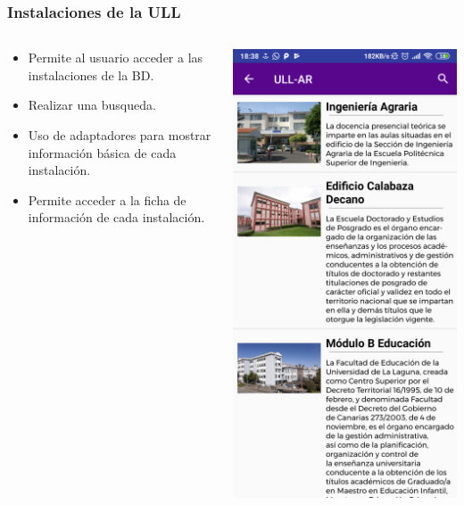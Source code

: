 \begin{frame}
	\frametitle{Instalaciones de la ULL}
	\begin{columns}
		\begin{column}{0.6\textwidth}
			\begin{itemize}
				\item Permite al usuario acceder a las instalaciones de la BD.
				\item Realizar una busqueda.
				\item Uso de adaptadores para mostrar información básica de cada instalación.
				\item Permite acceder a la ficha de información de cada instalación.
			\end{itemize}
			\endblock{}
		\end{column}
		\begin{column}{0.4\textwidth} 
			\vfill 
			\begin{center}
				\includegraphics[width=0.75\linewidth]{Images/allSitesApp}
			\end{center}
		\end{column}
	\end{columns}
\end{frame} 
  

